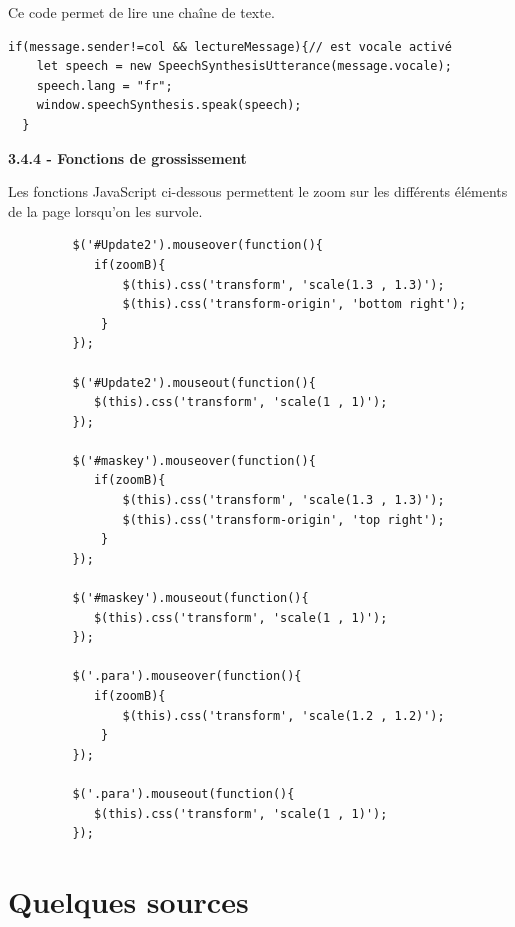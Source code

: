 \documentclass[12pt, openany]{report}
\begin{document}
Ce code permet de lire une chaîne de texte.

\begin{verbatim}
if(message.sender!=col && lectureMessage){// est vocale activé 
    let speech = new SpeechSynthesisUtterance(message.vocale);
    speech.lang = "fr";
    window.speechSynthesis.speak(speech);
  }
\end{verbatim}
\textbf{3.4.4 - Fonctions de grossissement}

Les fonctions JavaScript ci-dessous permettent le zoom sur les différents éléments de la page lorsqu'on les survole.

\begin{verbatim}
         $('#Update2').mouseover(function(){
         	if(zoomB){
	         	$(this).css('transform', 'scale(1.3 , 1.3)');
    	     	$(this).css('transform-origin', 'bottom right');
    	     }
         });

         $('#Update2').mouseout(function(){
         	$(this).css('transform', 'scale(1 , 1)');
         });

         $('#maskey').mouseover(function(){
         	if(zoomB){
	         	$(this).css('transform', 'scale(1.3 , 1.3)');
    	     	$(this).css('transform-origin', 'top right');
    	     }
         });

         $('#maskey').mouseout(function(){
         	$(this).css('transform', 'scale(1 , 1)');
         });

         $('.para').mouseover(function(){
         	if(zoomB){
	         	$(this).css('transform', 'scale(1.2 , 1.2)');
    	     }
         });

         $('.para').mouseout(function(){
         	$(this).css('transform', 'scale(1 , 1)');
         });
\end{verbatim}

\chapter{Quelques sources}
\end{document}
